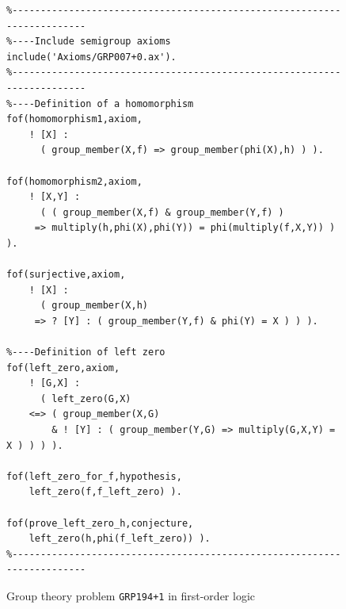 \documentclass[runningheads]{llncs}
\begin{document}
\begin{figure}[tb]
\centering
{\footnotesize
{\setlength{\baselineskip}{3mm}
\begin{verbatim}
%------------------------------------------------------------------------
%----Include semigroup axioms
include('Axioms/GRP007+0.ax').
%------------------------------------------------------------------------
%----Definition of a homomorphism
fof(homomorphism1,axiom,
    ! [X] :
      ( group_member(X,f) => group_member(phi(X),h) ) ).

fof(homomorphism2,axiom,
    ! [X,Y] :
      ( ( group_member(X,f) & group_member(Y,f) )
     => multiply(h,phi(X),phi(Y)) = phi(multiply(f,X,Y)) ) ).

fof(surjective,axiom,
    ! [X] :
      ( group_member(X,h)
     => ? [Y] : ( group_member(Y,f) & phi(Y) = X ) ) ).

%----Definition of left zero
fof(left_zero,axiom,
    ! [G,X] :
      ( left_zero(G,X)
    <=> ( group_member(X,G)
        & ! [Y] : ( group_member(Y,G) => multiply(G,X,Y) = X ) ) ) ).

fof(left_zero_for_f,hypothesis,
    left_zero(f,f_left_zero) ).

fof(prove_left_zero_h,conjecture,
    left_zero(h,phi(f_left_zero)) ).
%------------------------------------------------------------------------
\end{verbatim}
}}
\caption{Group theory problem {\tt GRP194+1} in first-order logic}
\label{ExampleFOF}
\end{figure}
\end{document}
